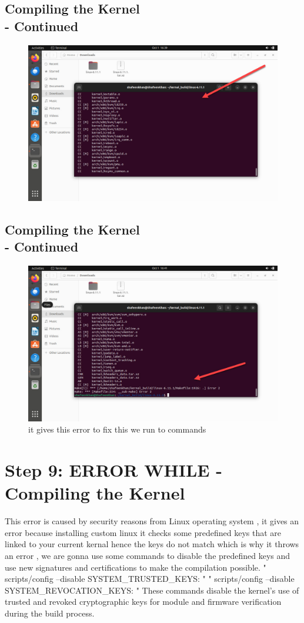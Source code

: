 \documentclass{article}
\begin{document}
\subsection{Compiling the Kernel \\-  Continued}
\begin{figure}[H]
    \centering
    \includegraphics[width=0.8\linewidth]{22.jpg}
    \caption{}
\end{figure}


\subsection{Compiling the Kernel \\-  Continued}
\begin{figure}[H]
    \centering
    \includegraphics[width=0.8\linewidth]{21.jpg}
    \caption{it gives this error to fix this we run to commands }
\end{figure}


\section*{Step 9: ERROR WHILE - Compiling the Kernel}
This error is caused by security reasons from Linux operating system , it gives an error because installing custom linux it checks some predefined keys that are linked to your current kernal hence the keys do not match which is why it throws an error , we are gonna use some commands to disable the predefined keys and use new signatures and certifications to make the compilation possible.
" scripts/config --disable SYSTEM\_TRUSTED\_KEYS: "
" scripts/config --disable SYSTEM\_REVOCATION\_KEYS: "
These commands disable the kernel's use of trusted and revoked cryptographic keys for module and firmware verification during the build process.
\end{document}
